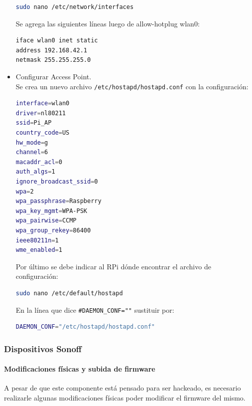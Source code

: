 \begin{itemize}
\begin{lstlisting}[language=bash]
sudo nano /etc/network/interfaces
\end{lstlisting}

Se agrega las siguientes líneas luego de allow-hotplug wlan0:

\begin{lstlisting}[language=bash]
iface wlan0 inet static
address 192.168.42.1
netmask 255.255.255.0
\end{lstlisting}

\item Configurar Access Point. \\
Se crea un nuevo archivo \lstinline[columns=fixed]{/etc/hostapd/hostapd.conf} con la configuración:

\begin{lstlisting}[language=bash]
interface=wlan0
driver=nl80211
ssid=Pi_AP
country_code=US
hw_mode=g
channel=6
macaddr_acl=0
auth_algs=1
ignore_broadcast_ssid=0
wpa=2
wpa_passphrase=Raspberry
wpa_key_mgmt=WPA-PSK
wpa_pairwise=CCMP
wpa_group_rekey=86400
ieee80211n=1
wme_enabled=1
\end{lstlisting}

Por último se debe indicar al RPi dónde encontrar el archivo de configuración:

\begin{lstlisting}[language=bash]
sudo nano /etc/default/hostapd
\end{lstlisting}

En la línea que dice \lstinline[columns=fixed]{#DAEMON_CONF=""} sustituir por:

\begin{lstlisting}[language=bash]
DAEMON_CONF="/etc/hostapd/hostapd.conf"
\end{lstlisting}
\end{itemize}

\subsubsection{Dispositivos Sonoff}

\paragraph{Modificaciones físicas y subida de firmware}
 A pesar de que este componente está pensado para ser hackeado, es necesario realizarle algunas modificaciones físicas poder modificar el firmware del mismo.

